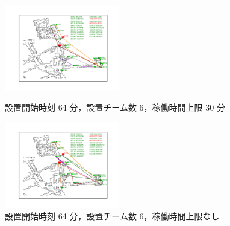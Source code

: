 \documentclass[a4paper,12pt,fleqn]{jarticle}
\begin{document}
\begin{figure}
 \begin{center}
  \begin{minipage}{0.49\hsize}
   \begin{center}
    \includegraphics[width=5cm,trim=100 50 100 50]{fig/64min_6team_lim30min.pdf}
    \caption{設置開始時刻 64 分，\newline \quad 設置チーム数 6，稼働時間上限 30 分}
    \label{fig:64min_6team_lim30min}
   \end{center}
  \end{minipage}
  \begin{minipage}{0.49\hsize}
   \begin{center}
    \includegraphics[width=5cm,trim=100 50 100 50]{fig/64min_6team_nolim.pdf}
    \caption{設置開始時刻 64 分，\newline \quad 設置チーム数 6，稼働時間上限なし}
    \label{fig:64min_6team_nolim}
   \end{center}
  \end{minipage}
 \end{center}
\end{figure}

\newpage
\end{document}
